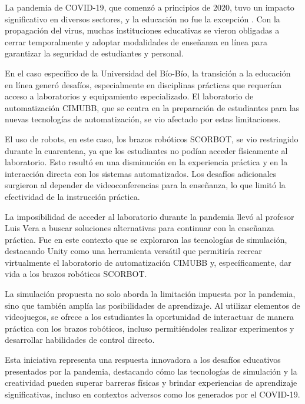 La pandemia de COVID-19, que comenzó a principios de 2020, tuvo un impacto significativo en diversos sectores, y la educación no fue la excepción \cite{Educacion}. Con la propagación del virus, muchas instituciones educativas se vieron obligadas a cerrar temporalmente y adoptar modalidades de enseñanza en línea para garantizar la seguridad de estudiantes y personal.

En el caso específico de la Universidad del Bío-Bío, la transición a la educación en línea generó desafíos, especialmente en disciplinas prácticas que requerían acceso a laboratorios y equipamiento especializado. El laboratorio de automatización CIMUBB, que se centra en la preparación de estudiantes para las nuevas tecnologías de automatización, se vio afectado por estas limitaciones.

El uso de robots, en este caso, los brazos robóticos SCORBOT, se vio restringido durante la cuarentena, ya que los estudiantes no podían acceder físicamente al laboratorio. Esto resultó en una disminución en la experiencia práctica y en la interacción directa con los sistemas automatizados. Los desafíos adicionales surgieron al depender de videoconferencias para la enseñanza, lo que limitó la efectividad de la instrucción práctica.

La imposibilidad de acceder al laboratorio durante la pandemia llevó al profesor Luis Vera a buscar soluciones alternativas para continuar con la enseñanza práctica. Fue en este contexto que se exploraron las tecnologías de simulación, destacando Unity como una herramienta versátil que permitiría recrear virtualmente el laboratorio de automatización CIMUBB y, específicamente, dar vida a los brazos robóticos SCORBOT.

La simulación propuesta no solo aborda la limitación impuesta por la pandemia, sino que también amplía las posibilidades de aprendizaje. Al utilizar elementos de videojuegos, se ofrece a los estudiantes la oportunidad de interactuar de manera práctica con los brazos robóticos, incluso permitiéndoles realizar experimentos y desarrollar habilidades de control directo.

Esta iniciativa representa una respuesta innovadora a los desafíos educativos presentados por la pandemia, destacando cómo las tecnologías de simulación y la creatividad pueden superar barreras físicas y brindar experiencias de aprendizaje significativas, incluso en contextos adversos como los generados por el COVID-19.

